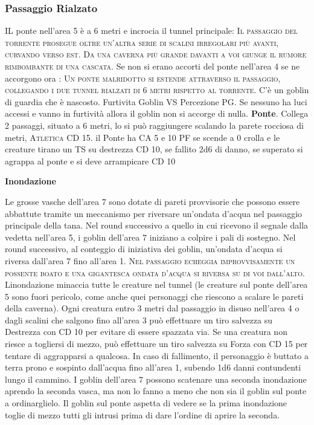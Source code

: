 \documentclass{article}
\begin{document}
\subsubsection{Passaggio Rialzato}
IL ponte nell'area 5 è a 6 metri e incrocia il tunnel principale: \textsc{Il passaggio del torrente prosegue oltre un'altra serie di scalini
irregolari più avanti, curvando verso est. Da una caverna più
grande davanti a voi giunge il rumore rimbombante di una
cascata.}
Se non si erano accorti del ponte nell'area 4 se ne accorgono ora : \textsc{Un ponte malridotto si estende attraverso il passaggio,
collegando i due tunnel rialzati di 6 metri rispetto al torrente.} C'è un goblin di guardia che è nascosto. Furtivita Goblin VS Percezione PG. Se nessuno ha luci accessi e vanno in furtività allora il goblin non si accorge di nulla. \newline
\textbf{Ponte}. Collega 2 passaggi, situato a 6 metri, lo si può raggiungere scalando la parete rocciosa di metri, \textsc{Atletica }CD 15. il Ponte ha CA 5 e 10 PF se scende a 0 crolla e le creature tirano un TS su destrezza CD 10, se fallito 2d6 di danno, se superato si agrappa al ponte e si deve arrampicare CD 10

\hypertarget{inondazione}{\textbf{Inondazione}}\newline
    Le grosse vasche dell’area 7 sono dotate di pareti provvisorie
che possono essere abbattute tramite un meccanismo per
riversare un'ondata d’acqua nel passaggio principale della
tana. Nel round successivo a quello in cui ricevono il segnale
dalla vedetta nell’area 5, i goblin dell’area 7 iniziano a colpire
i pali di sostegno. Nel round successivo, al conteggio di
iniziativa dei goblin, un'ondata d’acqua si riversa dall'area 7
fino all'area 1.\newline
\textsc{Nel passaggio echeggia improvvisamente un possente boato e
una gigantesca ondata d’acqua si riversa su di voi dall’alto.}\newline
Linondazione minaccia tutte le creature nel tunnel (le
creature sul ponte dell’area 5 sono fuori pericolo, come
anche quei personaggi che riescono a scalare le pareti della
caverna). Ogni creatura entro 3 metri dal passaggio in disuso
nell’area 4 o dagli scalini che salgono fino all’area 3 può
effettuare un tiro salvezza su Destrezza con CD 10 per evitare
di essere spazzata via. Se una creatura non riesce a togliersi
di mezzo, può effettuare un tiro salvezza su Forza con CD 15
per tentare di aggrapparsi a qualcosa. In caso di fallimento, il
personaggio è buttato a terra prono e sospinto dall'acqua fino
all'area 1, subendo 1d6 danni contundenti lungo il cammino.
I goblin dell’area 7 possono scatenare una seconda
inondazione aprendo la seconda vasca, ma non lo fanno
a meno che non sia il goblin sul ponte a ordinarglielo. Il
goblin sul ponte aspetta di vedere se la prima inondazione
toglie di mezzo tutti gli intrusi prima di dare l'ordine di
aprire la seconda.
\end{document}

